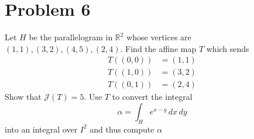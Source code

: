 \documentclass[11pt]{article}
\newcommand{\bbR}{\mathbb{R}}
\begin{document}
\newpage
\section*{Problem 6}
\begin{problem}
    Let $H$ be the parallelogram in $\bbR^2$ whose vertices are $(1,1), (3,2), (4,5), (2,4).$ Find the affine map $T$ which sends 
    \begin{align}
        T((0,0))&= (1,1)\\
        T((1,0)) &= (3,2)\\
        T((0,1)) &= (2,4)
    \end{align} Show that $\mathcal{J}(T) = 5$. Use $T$ to convert the integral 
    \[\alpha = \int_H e^{x-y}\, dx\,dy\] into an integral over $I^2$ and thus compute $\alpha$
\end{problem}
\end{document}
